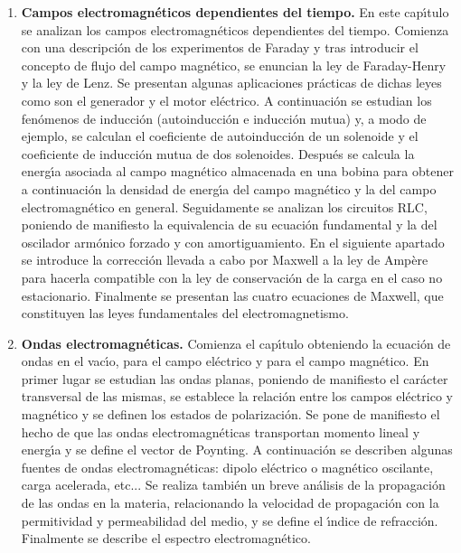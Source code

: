 \begin{enumerate} [{\bf 1. }]
\item {\bf Campos electromagn\'{e}ticos dependientes del tiempo.}
En este cap\'{\i}tulo se analizan los campos electromagn\'{e}ticos dependientes 
del tiempo. Comienza con una descripci\'{o}n de los experimentos de Faraday y tras
introducir el concepto de flujo del campo magn\'{e}tico,
 se enuncian la ley de Faraday-Henry y la ley de Lenz. 
Se presentan algunas aplicaciones pr\'{a}cticas de dichas leyes como son el
 generador y el motor el\'{e}ctrico. A continuaci\'{o}n se estudian los 
fen\'{o}menos de inducci\'{o}n (autoinducci\'{o}n e inducci\'{o}n mutua) y, 
a modo de ejemplo, se calculan el coeficiente de autoinducci\'{o}n de un 
solenoide y el coeficiente de inducci\'{o}n mutua de dos solenoides. 
Despu\'{e}s se calcula la energ\'{\i}a asociada al campo magn\'{e}tico almacenada
 en una bobina para obtener a continuaci\'{o}n la densidad de energ\'{\i}a del
 campo magn\'{e}tico y la del campo electromagn\'{e}tico en general. 
Seguidamente se analizan los circuitos RLC, poniendo de manifiesto 
la equivalencia de su ecuaci\'{o}n fundamental y la del oscilador arm\'{o}nico 
forzado y con amortiguamiento. En el siguiente apartado se introduce la 
correcci\'{o}n llevada a cabo por Maxwell a la ley de Amp\`{e}re para 
hacerla compatible con la ley de conservaci\'{o}n de la carga en el caso no estacionario.
 Finalmente se presentan las cuatro ecuaciones de Maxwell, que constituyen las leyes fundamentales del electromagnetismo.


\item {\bf Ondas electromagn\'{e}ticas.}
Comienza el cap\'{\i}tulo obteniendo la ecuaci\'{o}n de ondas en el vac\'{\i}o,
  para el campo el\'{e}ctrico y para el campo magn\'{e}tico. En primer
 lugar se estudian las ondas planas, poniendo de manifiesto el car\'{a}cter 
transversal de las mismas, se establece la relaci\'{o}n entre los campos 
el\'{e}ctrico y magn\'{e}tico y se definen los estados de polarizaci\'{o}n.
 Se pone de manifiesto el hecho de que las ondas electromagn\'{e}ticas
 transportan momento lineal y energ\'{\i}a y se define el vector de Poynting.
 A continuaci\'{o}n se describen algunas fuentes de ondas electromagn\'{e}ticas:
 dipolo el\'{e}ctrico o magn\'{e}tico oscilante, carga acelerada, etc... 
Se realiza tambi\'{e}n un breve an\'{a}lisis de la propagaci\'{o}n de las ondas 
en la materia, relacionando la velocidad de propagaci\'{o}n con la permitividad y 
permeabilidad del medio, y se define el \'{\i}ndice de refracci\'{o}n.
 Finalmente se describe el espectro electromagn\'{e}tico.




\end{enumerate}
